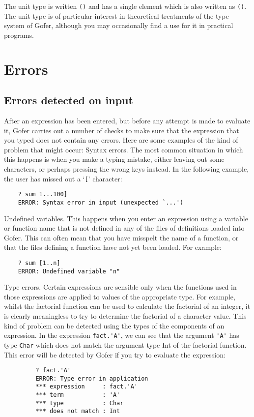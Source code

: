 The unit type is written \verb"()" and has a  single  element  which  is  also
written as \verb"()".  The unit type is of particular interest in  theoretical
treatments of the type system of Gofer, although you  may  occasionally
find a use for it in practical programs.


\chapter{Errors}

\section{Errors detected on input}
After an expression has been entered, but before any attempt is made to
evaluate it, Gofer carries out a number of checks to make sure that the
expression that you typed does not contain any errors.  Here  are  some
examples of the kind of problem that might occur:
\BI
\IT  Syntax errors.  The most common situation in which this happens is
     when  you  make  a  typing  mistake,  either  leaving   out   some
     characters, or perhaps pressing the wrong keys  instead.   In  the
     following example, the user has missed out a `\verb"["' character:
\begin{verbatim}
    ? sum 1...100]
    ERROR: Syntax error in input (unexpected `...')
\end{verbatim}
\IT  Undefined variables.  This happens when you  enter  an  expression
     using a variable or function name that is not defined  in  any  of
     the files of definitions loaded into Gofer.  This can  often  mean
     that you have misspelt the name of a function, or that  the  files
     defining a function have not yet been loaded.  For example:
\begin{verbatim}
    ? sum [1..n]
    ERROR: Undefined variable "n"
\end{verbatim}
\IT  Type errors.  Certain  expressions  are  sensible  only  when  the
     functions used in those expressions are applied to values  of  the
     appropriate type.  For example, whilst the factorial function  can
     be used to calculate the factorial of an integer,  it  is  clearly
     meaningless to try to  determine  the  factorial  of  a  character
     value.  This kind of problem can be detected using  the  types  of
     the components of an expression.  In the expression \verb"fact.'A'", we
     can see that the argument \verb"'A'" has type \verb"Char"
     which does  not  match
     the argument type Int of the factorial function.  This error  will
     be detected by Gofer if you try to evaluate the expression:
\begin{verbatim}
         ? fact.'A'
         ERROR: Type error in application
         *** expression     : fact.'A'
         *** term           : 'A'
         *** type           : Char
         *** does not match : Int
\end{verbatim}
\EI

